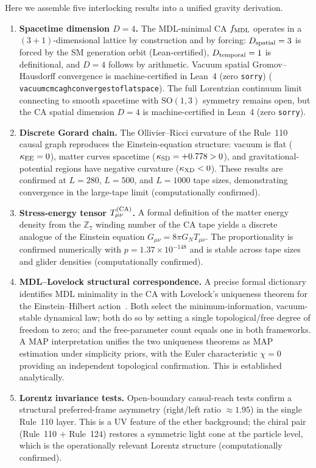 \documentclass[11pt]{article}
\theoremstyle{remark}
\newcommand{\lean}[1]{%
  \penalty-100
  \begingroup\def\_{\textunderscore\allowbreak}\texttt{#1}\endgroup}
\newcommand{\CatA}{computationally confirmed}
\newcommand{\CatAL}{machine-certified in Lean~4 (zero \texttt{sorry})}
\newcommand{\kEE}{\kappa_{\rm EE}}
\newcommand{\kSD}{\kappa_{\rm SD}}
\newcommand{\kXD}{\kappa_{\rm XD}}
\newcommand{\fmdl}{f_{\rm MDL}}
\begin{document}
Here we assemble five interlocking results into a unified gravity derivation.
\begin{enumerate}[leftmargin=2em]
\item \textbf{Spacetime dimension $D = 4$.}
The MDL-minimal CA $\fmdl$ operates in a $(3+1)$-dimensional lattice by
construction and by forcing: $D_{\rm spatial} = 3$ is forced by the SM
generation orbit (Lean-certified), $D_{\rm temporal} = 1$ is definitional,
and $D = 4$ follows by arithmetic.
Vacuum spatial Gromov--Hausdorff convergence is \CatAL{}
(\lean{vacuum\_cmca\_gh\_converges\_to\_flat\_space}). The full Lorentzian continuum limit
connecting to smooth spacetime with $\mathrm{SO}(1,3)$ symmetry remains open, but the CA
spatial dimension $D = 4$ is \CatAL{}.

\item \textbf{Discrete Gorard chain.}
The Ollivier--Ricci curvature \cite{Ollivier2007,Ollivier2009} of the Rule~110
causal graph reproduces the Einstein-equation structure: vacuum is flat
($\kEE = 0$), matter curves spacetime ($\kSD = +0.778 > 0$), and
gravitational-potential regions have negative curvature ($\kXD < 0$).
These results are confirmed at $L = 280$, $L = 500$, and $L = 1000$ tape
sizes, demonstrating convergence in the large-tape limit (\CatA).

\item \textbf{Stress-energy tensor $T_{\mu\nu}^{(\rm CA)}$.}
A formal definition of the matter energy density from the $\mathbb{Z}_7$
winding number of the CA tape yields a discrete analogue of the Einstein
equation $G_{\mu\nu} = 8\pi G_N T_{\mu\nu}$.
The proportionality is confirmed numerically with $p = 1.37 \times 10^{-148}$
and is stable across tape sizes and glider densities (\CatA).

\item \textbf{MDL--Lovelock structural correspondence.}
A precise formal dictionary identifies MDL minimality in the CA with
Lovelock's uniqueness theorem for the Einstein--Hilbert action~\cite{Lovelock1971}.
Both select the minimum-information, vacuum-stable dynamical law; both do so
by setting a single topological/free degree of freedom to zero; and the
free-parameter count equals one in both frameworks.
A MAP interpretation unifies the two uniqueness theorems as MAP estimation
under simplicity priors, with the Euler characteristic $\chi = 0$ providing
an independent topological confirmation.
This is established analytically.

\item \textbf{Lorentz invariance tests.}
Open-boundary causal-reach tests confirm a structural preferred-frame
asymmetry (right/left ratio $\approx 1.95$) in the single Rule~110 layer.
This is a UV feature of the ether background; the chiral pair
(Rule~110 $+$ Rule~124) restores a symmetric light cone at the particle level,
which is the operationally relevant Lorentz structure (\CatA).
\end{enumerate}
\end{document}
